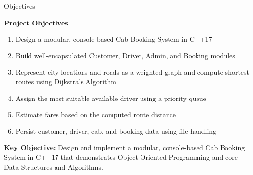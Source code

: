 \documentclass[aspectratio=169,11pt]{beamer}
\begin{document}
\begin{frame}{Objectives}

\small
\textbf{\color{GEUBlue}Project Objectives}
\vspace{1mm}

\begin{enumerate}\itemsep1.5pt
\item Design a modular, console-based Cab Booking System in C++17
\item Build well-encapsulated Customer, Driver, Admin, and Booking modules
\item Represent city locations and roads as a weighted graph and compute shortest routes using Dijkstra's Algorithm
\item Assign the most suitable available driver using a priority queue
\item Estimate fares based on the computed route distance
\item Persist customer, driver, cab, and booking data using file handling
\end{enumerate}

\vspace{1mm}

\begin{center}
\colorbox{GEULightBlue}{%
\parbox{0.80\textwidth}{%
\centering
\small
\textbf{Key Objective:} Design and implement a modular, console-based Cab Booking System in C++17 that demonstrates Object-Oriented Programming and core Data Structures and Algorithms.%
}}
\end{center}

\end{frame}
\end{document}
